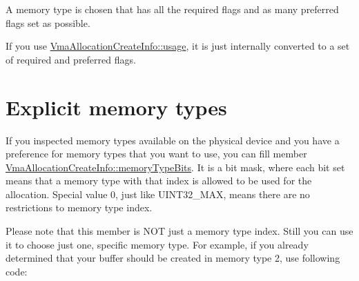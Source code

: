 A memory type is chosen that has all the required flags and as many preferred flags set as possible.

If you use \hyperlink{structVmaAllocationCreateInfo_accb8b06b1f677d858cb9af20705fa910}{Vma\+Allocation\+Create\+Info\+::usage}, it is just internally converted to a set of required and preferred flags.\hypertarget{choosing_memory_type_choosing_memory_type_explicit_memory_types}{}\section{Explicit memory types}\label{choosing_memory_type_choosing_memory_type_explicit_memory_types}
If you inspected memory types available on the physical device and you have a preference for memory types that you want to use, you can fill member \hyperlink{structVmaAllocationCreateInfo_a3bf940c0271d85d6ba32a4d820075055}{Vma\+Allocation\+Create\+Info\+::memory\+Type\+Bits}. It is a bit mask, where each bit set means that a memory type with that index is allowed to be used for the allocation. Special value 0, just like {\ttfamily U\+I\+N\+T32\+\_\+\+M\+AX}, means there are no restrictions to memory type index.

Please note that this member is N\+OT just a memory type index. Still you can use it to choose just one, specific memory type. For example, if you already determined that your buffer should be created in memory type 2, use following code\+:


